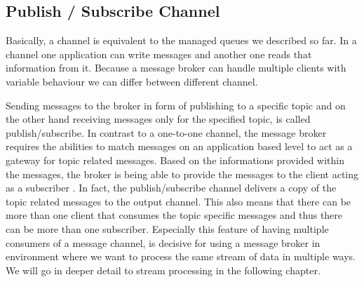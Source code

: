 

\subsection{Publish / Subscribe Channel} 
Basically, a channel is equivalent to the managed queues we described so far. In
a channel one application can write messages and another one reads that
information from it. Because a message broker can handle multiple clients with
variable behaviour we can differ between different channel.

Sending messages to the broker in form of publishing to a specific topic and on
the other hand receiving messages only for the specified topic, is called
publish/subscribe. In contrast to a one-to-one channel, the message broker
requires the abilities to match messages on an application based level to act as
a gateway for topic related messages. Based on the informations provided within
the messages, the broker is being able to provide the messages to the client
acting as a subscriber \cite{TAN06}. In fact, the publish/subscribe channel
delivers a copy of the topic related messages to the output channel. This also
means that there can be more than one client that consumes the topic specific
messages and thus there can be more than one subscriber. Especially this feature
of having multiple consumers of a message channel, is decisive for using a
message broker in environment where we want to process the same stream of
data in multiple ways. We will go in deeper detail to stream processing in the
following chapter. \cite{EIP03}
